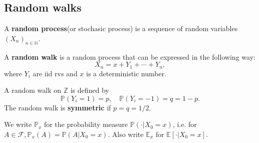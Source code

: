 \subsection{Random walks}
\begin{definition}
    A \textbf{random process}(or stochasic process) is a sequence of random variables $ (X_n)_{n\in \mathbb{N}} $.
\end{definition}
\begin{definition}
    A \textbf{random walk} is a random process that can be expressed in the following way: 
    \[
        X_n = x+Y_1+\cdots+Y_n,
    \]
    where $Y_i$ are iid rvs and $x$ is a deterministic number.
\end{definition}
\begin{definition}
    A random walk on $\mathbb{Z}$ is defined by 
    \[
        \mathbb{P}(Y_i=1) = p,\quad \mathbb{P}(Y_i=-1)=q=1-p.
    \] 
    The random walk is \textbf{symmetric} if $p=q=1/2$.
\end{definition}

\begin{notation}
    We write $ \mathbb{P}_x $ for the probability measure $ \mathbb{P}(\cdot | X_0=x) $, i.e. for $ A\in \mathscr{F}, \mathbb{P}_x(A) = \mathbb{P}(A|X_0=x) $. Also write $ \mathbb{E}_x $ for $ \mathbb{E}[\cdot|X_0=x] $.
\end{notation}

